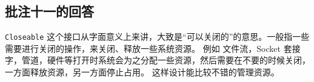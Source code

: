 \subsection{批注十一的回答}
\label{sec:fix:bl11}

\lstinline|Closeable| 这个接口从字面意义上来讲，大致是“可以关闭的”的意思。一般指一些需要进行关闭的操作，来关闭、释放一些系统资源。
例如 文件流，Socket 套接字，管道，硬件等打开时系统会为之分配一些资源，然后需要在不要的时候关闭，一方面释放资源，另一方面停止占用。
这样设计能比较不错的管理资源。